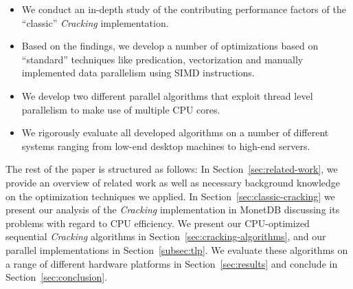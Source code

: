 \vspace{-1ex}
\begin{itemize}
\item We conduct an in-depth study of the contributing performance factors
  of the ``classic'' \emph{Cracking} implementation.
\item Based on the findings, we develop a number of optimizations
  based on ``standard'' techniques like predication, vectorization and
  manually implemented data parallelism using SIMD instructions.
\item We develop two different parallel algorithms that exploit thread
  level parallelism to make use of multiple CPU cores.
\item We rigorously evaluate all developed algorithms on a number of
  different systems ranging from low-end desktop machines to high-end
  servers.
\end{itemize}
\vspace{-1ex}

The rest of the paper is structured as follows: In
Section~\ref{sec:related-work}, we provide an overview of related work
as well as necessary background knowledge on the optimization
techniques we applied. In Section~\ref{sec:classic-cracking} we
present our analysis of the \emph{Cracking} implementation in MonetDB
discussing its problems with regard to CPU efficiency.
We present our CPU-optimized sequential \emph{Cracking} algorithms
in Section~\ref{sec:cracking-algorithms},
and our parallel implementations in Section~\ref{subsec:tlp}.
We evaluate these algorithms on a range of different
hardware platforms in Section~\ref{sec:results} and conclude in
Section~\ref{sec:conclusion}.

